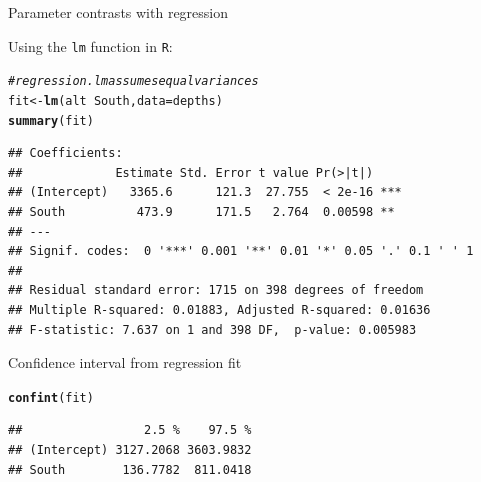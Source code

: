 \documentclass[10pt]{beamer}\usepackage[]{graphicx}\usepackage[]{color}
\makeatletter
\newcommand{\hlcom}[1]{\textcolor[rgb]{0.678,0.584,0.686}{\textit{#1}}}%
\newcommand{\hlopt}[1]{\textcolor[rgb]{0,0,0}{#1}}%
\newcommand{\hlstd}[1]{\textcolor[rgb]{0.345,0.345,0.345}{#1}}%
\newcommand{\hlkwb}[1]{\textcolor[rgb]{0.69,0.353,0.396}{#1}}%
\newcommand{\hlkwc}[1]{\textcolor[rgb]{0.333,0.667,0.333}{#1}}%
\newcommand{\hlkwd}[1]{\textcolor[rgb]{0.737,0.353,0.396}{\textbf{#1}}}%
\newenvironment{kframe}{%
 \def\at@end@of@kframe{}%
 \ifinner\ifhmode%
  \def\at@end@of@kframe{\end{minipage}}%
  \begin{minipage}{\columnwidth}%
 \fi\fi%
 \def\FrameCommand##1{\hskip\@totalleftmargin \hskip-\fboxsep
 \colorbox{shadecolor}{##1}\hskip-\fboxsep
     \hskip-\linewidth \hskip-\@totalleftmargin \hskip\columnwidth}%
 \MakeFramed {\advance\hsize-\width
   \@totalleftmargin\z@ \linewidth\hsize
   \@setminipage}}%
 {\par\unskip\endMakeFramed%
 \at@end@of@kframe}
\newenvironment{knitrout}{}{} %
\makeatother
\begin{document}
\begin{frame}[fragile]{Parameter contrasts with regression}
	
	Using the \texttt{lm} function in \texttt{R}:
	
	
\begin{knitrout}\scriptsize
{}\color{fgcolor}\begin{kframe}
\begin{alltt}
\hlcom{# regression. lm assumes equal variances}
\hlstd{fit} \hlkwb{<-} \hlkwd{lm}\hlstd{(alt} \hlopt{~} \hlstd{South,} \hlkwc{data} \hlstd{= depths)}
\hlkwd{summary}\hlstd{(fit)}
\end{alltt}
\begin{verbatim}
## Coefficients:
##             Estimate Std. Error t value Pr(>|t|)    
## (Intercept)   3365.6      121.3  27.755  < 2e-16 ***
## South          473.9      171.5   2.764  0.00598 ** 
## ---
## Signif. codes:  0 '***' 0.001 '**' 0.01 '*' 0.05 '.' 0.1 ' ' 1
## 
## Residual standard error: 1715 on 398 degrees of freedom
## Multiple R-squared: 0.01883,	Adjusted R-squared: 0.01636 
## F-statistic: 7.637 on 1 and 398 DF,  p-value: 0.005983
\end{verbatim}
\end{kframe}
\end{knitrout}
	
	
\end{frame}


\begin{frame}[fragile]{Confidence interval from regression fit}
	
\begin{knitrout}\scriptsize
{}\color{fgcolor}\begin{kframe}
\begin{alltt}
\hlkwd{confint}\hlstd{(fit)}
\end{alltt}
\begin{verbatim}
##                 2.5 %    97.5 %
## (Intercept) 3127.2068 3603.9832
## South        136.7782  811.0418
\end{verbatim}
\end{kframe}
\end{knitrout}
	
	
\end{frame}
\end{document}
